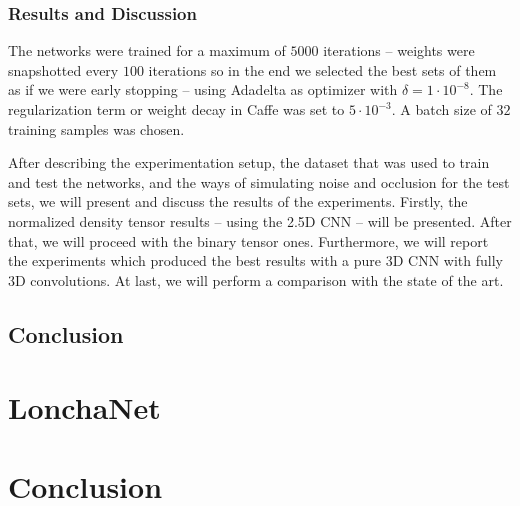 \subsubsection{Results and Discussion}
\label{cha:objrecog:sec:study:subsec:experiments:subsubsec:results}

The networks were trained for a maximum of $5000$ iterations -- weights were snapshotted every $100$ iterations so in the end we selected the best sets of them as if we were early stopping -- using Adadelta as optimizer with $\delta = 1\cdot10^{-8}$. The regularization term or weight decay in Caffe was set to $5\cdot10^{-3}$. A batch size of $32$ training samples was chosen.

After describing the experimentation setup, the dataset that was used to train and test the networks, and the ways of simulating noise and occlusion for the test sets, we will present and discuss the results of the experiments. Firstly, the normalized density tensor results -- using the \acs{2.5D} \acs{CNN} -- will be presented. After that, we will proceed with the binary tensor ones. Furthermore, we will report the experiments which produced the best results with a pure \acs{3D} \acs{CNN} with fully \acs{3D} convolutions. At last, we will perform a comparison with the state of the art.

\subsection{Conclusion}
\label{cha:objrecog:sec:study:subsec:conclusion}

\section{LonchaNet}
\label{cha:objrecog:sec:lonchanet}

\section{Conclusion}
\label{cha:objrecog:sec:conclusion}

